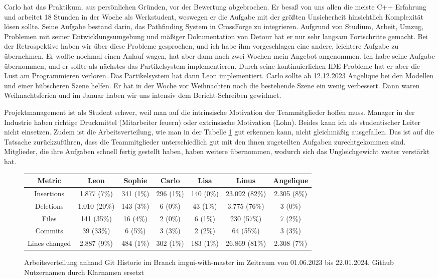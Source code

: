 Carlo hat das Praktikum, aus persönlichen Gründen, vor der Bewertung abgebrochen. Er besaß von uns allen die meiste C++ Erfahrung und arbeitet 18 Stunden in der Woche als Werkstudent, weswegen er die Aufgabe mit der größten Unsicherheit hinsichtlich Komplexität lösen sollte. Seine Aufgabe bestand darin, das Pathfinding System in CrossForge zu integrieren. Aufgrund von Studium, Arbeit, Umzug, Problemen mit seiner Entwicklungsumgebung und mäßiger Dokumentation von Detour hat er nur sehr langsam Fortschritte gemacht.  Bei der Retrospektive haben wir über diese Probleme gesprochen, und ich habe ihm vorgeschlagen eine andere, leichtere Aufgabe zu übernehmen. Er wollte nochmal einen Anlauf wagen, hat aber dann nach zwei Wochen mein Angebot angenommen. Ich habe seine Aufgabe übernommen, und er sollte als nächstes das Partikelsystem implementieren. Durch seine kontinuierlichen IDE Probleme hat er aber die Lust am Programmieren verloren. Das Partikelsystem hat dann Leon implementiert. Carlo sollte ab 12.12.2023 Angelique bei den Modellen und einer hübscheren Szene helfen. Er hat in der Woche vor Weihnachten noch die bestehende Szene ein wenig verbessert. Dann waren Weihnachtsferien und im Januar haben wir uns intensiv dem Bericht-Schreiben gewidmet.

Projektmanagement ist als Student schwer, weil man auf die intrinsische Motivation der Teammitglieder hoffen muss. Manager in der Industrie haben richtige Druckmittel (Mitarbeiter feuern) oder extrinsische Motivation (Lohn). Beides kann ich als studentischer Leiter nicht einsetzen. 
Zudem ist die Arbeitsverteilung, wie man in der Tabelle \ref{arbeitsaufteilung} gut erkennen kann, nicht gleichmäßig ausgefallen. Das ist auf die Tatsache zurückzuführen, dass die Teammitglieder unterschiedlich gut mit den ihnen zugeteilten Aufgaben zurechtgekommen sind. Mitglieder, die ihre Aufgaben schnell fertig gestellt haben, haben weitere übernommen, wodurch sich das Ungleichgewicht weiter verstärkt hat.

\begin{figure}[h!]
\begin{tabular}{|c|c|c|c|c|c|c|}
\hline
Metric        & Leon         & Sophie    & Carlo     & Lisa      & Linus         & Angelique \\
\hline
Insertions    & 1.877 (7\%)  & 341 (1\%) & 296 (1\%) & 140 (0\%) & 23.092 (82\%) & 2.305 (8\%) \\
\hline
Deletions     & 1.010 (20\%) & 143 (3\%) & 6 (0\%)   & 43 (1\%)  & 3.775 (76\%)  & 3 (0\%) \\
\hline
Files         & 141 (35\%)   & 16 (4\%)  & 2 (0\%)   & 6 (1\%)   & 230 (57\%)    & 7 (2\%) \\
\hline
Commits       & 39 (33\%)    & 6 (5\%)   & 3 (3\%)   & 2 (2\%)   & 64 (55\%)     & 3 (3\%) \\
\hline
Lines changed & 2.887 (9\%)  & 484 (1\%) & 302 (1\%) & 183 (1\%) & 26.869 (81\%) & 2.308 (7\%) \\
\hline
\end{tabular}
\caption{Arbeitsverteilung anhand Git Historie im Branch imgui-with-master im Zeitraum von 01.06.2023 bis 22.01.2024. Github Nutzernamen durch Klarnamen ersetzt}
\label{arbeitsaufteilung}
\end{figure}

